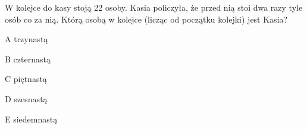 \begin{tresc}
W kolejce do kasy stoją 22 osoby. Kasia policzyła, że przed nią stoi dwa razy tyle osób co za nią. Którą osobą w kolejce (licząc od początku kolejki) jest Kasia?
\end{tresc}
\begin{wariant}{A} trzynastą \end{wariant}
\begin{wariant}{B} czternastą \end{wariant}
\begin{wariant}{C} piętnastą \end{wariant}
\begin{wariant}{D} szesnastą \end{wariant}
\begin{wariant}{E} siedemnastą \end{wariant}
